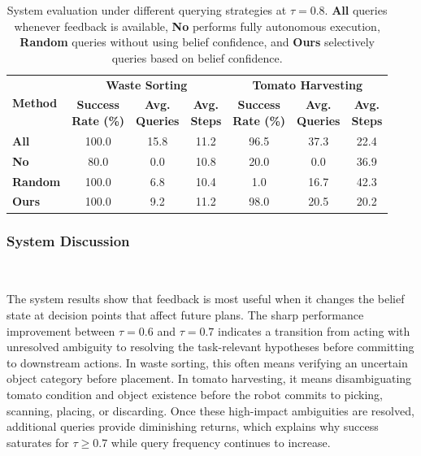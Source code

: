\begin{table}[t]
\centering
\caption{System evaluation under different querying strategies at $\tau=0.8$. \textbf{All} queries whenever feedback is available, \textbf{No} performs fully autonomous execution, \textbf{Random} queries without using belief confidence, and \textbf{Ours} selectively queries based on belief confidence.}
\label{tab:system_eval}
\small
\setlength{\tabcolsep}{4pt}
\begin{tabular*}{\textwidth}{@{\extracolsep{\fill}}lcccccc}
\toprule
\multirow{2}{*}{\textbf{Method}} & \multicolumn{3}{c}{\textbf{Waste Sorting}} & \multicolumn{3}{c}{\textbf{Tomato Harvesting}} \\
\cmidrule(lr){2-4}\cmidrule(lr){5-7}
& \makecell{\textbf{Success}\\\textbf{Rate (\%)}} & \makecell{\textbf{Avg.}\\\textbf{Queries}} & \makecell{\textbf{Avg.}\\\textbf{Steps}} & \makecell{\textbf{Success}\\\textbf{Rate (\%)}} & \makecell{\textbf{Avg.}\\\textbf{Queries}} & \makecell{\textbf{Avg.}\\\textbf{Steps}} \\
\midrule
\textbf{All}    & 100.0 & 15.8 & 11.2 & 96.5 & 37.3 & 22.4 \\
\textbf{No}     & 80.0  & 0.0  & 10.8 & 20.0 & 0.0  & 36.9 \\
\textbf{Random} & 100.0 & 6.8  & 10.4 & 1.0  & 16.7 & 42.3 \\
\textbf{Ours}   & 100.0 & 9.2  & 11.2 & 98.0 & 20.5 & 20.2 \\
\bottomrule
\end{tabular*}
\end{table}


\subsubsection{System Discussion}~\label{exp:sys_discussion}

The system results show that feedback is most useful when it changes the belief state at decision points that affect future plans. The sharp performance improvement between $\tau=0.6$ and $\tau=0.7$ indicates a transition from acting with unresolved ambiguity to resolving the task-relevant hypotheses before committing to downstream actions. In waste sorting, this often means verifying an uncertain object category before placement. In tomato harvesting, it means disambiguating tomato condition and object existence before the robot commits to picking, scanning, placing, or discarding. Once these high-impact ambiguities are resolved, additional queries provide diminishing returns, which explains why success saturates for $\tau \geq 0.7$ while query frequency continues to increase.

